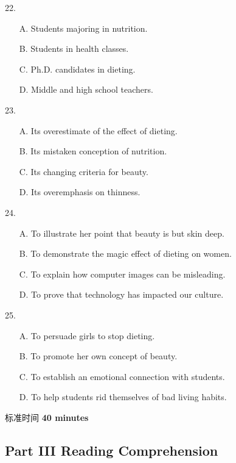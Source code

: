 \documentclass[UTF8,11pt]{ctexart}
\begin{document}
22.


\begin{itemize}[leftmargin=2em,itemsep=.2em,topsep=.4em]\item[A.] Students majoring in nutrition.
\item[B.] Students in health classes.
\item[C.] Ph.D. candidates in dieting.
\item[D.] Middle and high school teachers.
\end{itemize}

23.


\begin{itemize}[leftmargin=2em,itemsep=.2em,topsep=.4em]\item[A.] Its overestimate of the effect of dieting.
\item[B.] Its mistaken conception of nutrition.
\item[C.] Its changing criteria for beauty.
\item[D.] Its overemphasis on thinness.
\end{itemize}

24.


\begin{itemize}[leftmargin=2em,itemsep=.2em,topsep=.4em]\item[A.] To illustrate her point that beauty is but skin deep.
\item[B.] To demonstrate the magic effect of dieting on women.
\item[C.] To explain how computer images can be misleading.
\item[D.] To prove that technology has impacted our culture.
\end{itemize}

25.


\begin{itemize}[leftmargin=2em,itemsep=.2em,topsep=.4em]\item[A.] To persuade girls to stop dieting.
\item[B.] To promote her own concept of beauty.
\item[C.] To establish an emotional connection with students.
\item[D.] To help students rid themselves of bad living habits.
\end{itemize}

标准时间 \textbf{40 minutes}


\subsection*{\textbf{Part III} \textbf{Reading Comprehension}}
\end{document}
